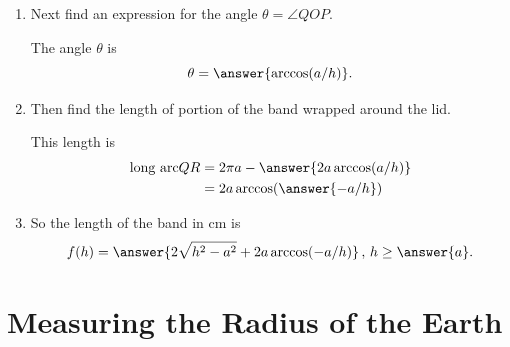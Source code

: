 \documentclass{ximera}
\begin{document}
\begin{question}
\begin{enumerate}
\begin{enumerate}
The length is 
\[
  PQ = \answer{\sqrt{h^2-a^2}}.
\]

\item Next find an expression for the angle $\theta = \angle QOP$.

The angle $\theta$ is
\[
  \theta = \answer{\arccos(a/h)}.
\]

\item Then find the length of portion of the band wrapped around the lid.

This length is 
\begin{align*}
\text{long arc} QR &= 2\pi a - \answer{2a\arccos(a/h)} \\
                           &= 2a \arccos (\answer{-a/h})
\end{align*} 

\item So the length of the band in cm is
\[
 f(h) = \answer{2\sqrt{h^2 - a^2}+2a\arccos(-a/h)} \, , \, h\geq \answer{a} .
\]
\end{enumerate}
\end{enumerate}
\end{question}

\section{Measuring the Radius of the Earth}
\end{document}
